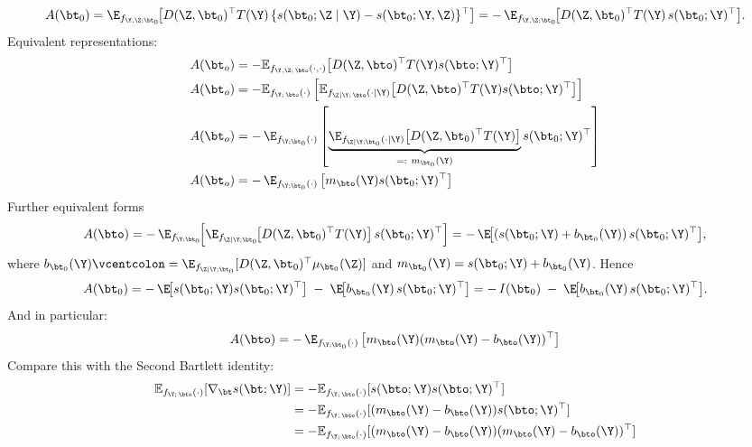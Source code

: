 \[
A(\bt_0)
= \E_{f_{\Y,\Z;\bt_0}}\!\big[D(\Z,\bt_0)^\top T(\Y)\,\{s(\bt_0;\Z\mid \Y)-s(\bt_0;\Y,\Z)\}^\top\big]
= -\,\E_{f_{\Y,\Z;\bt_0}}\!\big[D(\Z,\bt_0)^\top T(\Y)\,s(\bt_0;\Y)^\top\big].
\]
%
Equivalent representations:
\begin{align}
    A(\bt_o) &= - \mathbb{E}_{f_{\Y,\Z;\,\bto}(\cdot, \cdot)}\!\left[D(\Z,\bto)^\top T(\Y) s(\bto;\Y)^\top \right]\\
    A(\bt_o) &= - \mathbb{E}_{f_{\Y;\,\bto}(\cdot)}\left[ \mathbb{E}_{f_{\Z\mid\Y;\,\bto}(\cdot\mid\Y)}\!\left[D(\Z,\bto)^\top T(\Y) s(\bto;\Y)^\top \right]\right]\\
    A(\bt_o) &= -\,\E_{f_{\Y;\bt_0}(\cdot)}\left[\underbrace{\E_{f_{\Z\mid \Y;\bt_0}(\cdot|\Y)}\big[D(\Z,\bt_0)^\top T(\Y)\big]}_{=:~m_{\bt_0}(\Y)}s(\bt_0;\Y)^\top\right]\\
    A(\bt_o) &= -\,\E_{f_{\Y;\bt_0}(\cdot)}\left[m_\bto(\Y)s(\bt_0;\Y)^\top\right]\\
\end{align}
%
\noindent Further equivalent forms
\[
A(\bto)
= -\,\E_{f_{\Y;\bt_0}}\!\Big[\E_{f_{\Z\mid \Y;\bt_0}}\!\big[D(\Z,\bt_0)^\top T(\Y)\big]\,s(\bt_0;\Y)^\top\Big]
= -\,\E\!\big[(s(\bt_0;\Y)+b_{\bt_0}(\Y))\,s(\bt_0;\Y)^\top\big],
\]
where \(b_{\bt_0}(\Y)\vcentcolon=\E_{f_{\Z\mid \Y;\bt_0}}[D(\Z,\bt_0)^\top\mu_{\bt_0}(\Z)]\) and
\(m_{\bt_0}(\Y)=s(\bt_0;\Y)+b_{\bt_0}(\Y)\). Hence
\[
A(\bt_0) = -\,\E\!\big[s(\bt_0;\Y)s(\bt_0;\Y)^\top\big]\;-\;\E\!\big[b_{\bt_0}(\Y)\,s(\bt_0;\Y)^\top\big]
= -\,I(\bt_0)\;-\;\E\!\big[b_{\bt_0}(\Y)\,s(\bt_0;\Y)^\top\big].
\]
%
And in particular:
\begin{equation}
    A(\bto) = -\,\E_{f_{\Y;\bt_0}(\cdot)}\left[m_\bto(\Y)(m_\bto(\Y) - b_\bto(\Y))^\top\right]
\end{equation}
Compare this with the Second Bartlett identity:
%
\begin{align}
    \mathbb{E}_{f_{\Y;\,\bto}(\cdot)}[\nabla_\bt s(\bt;\Y)] &= - \mathbb{E}_{f_{\Y;\,\bto}(\cdot)}[s(\bto;\Y)s(\bto;\Y)^\top]\\
    &= - \mathbb{E}_{f_{\Y;\,\bto}(\cdot)}[(m_\bto(\Y) - b_\bto(\Y))s(\bto;\Y)^\top]\\
    &= - \mathbb{E}_{f_{\Y;\,\bto}(\cdot)}[(m_\bto(\Y) - b_\bto(\Y))(m_\bto(\Y) - b_\bto(\Y))^\top]
\end{align}


